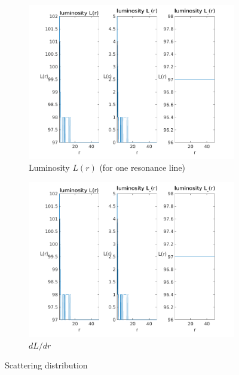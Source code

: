 \documentclass[../main/main.tex]{subfiles}
\begin{document}
\begin{figure}[!htbp]
\hspace*{-0.5in}
\centering
\begin{subfigure}{.6\textwidth}
\includegraphics[width=1\textwidth]{../../two_resonance_lines/figures/luminosity_one_resonance_line.png}
\caption{Luminosity $L(r)$ (for one resonance line)}
\label{luminosity_one_resonance_line}
\end{subfigure}%
\begin{subfigure}{.6\textwidth}
\includegraphics[width=1\textwidth]{../../two_resonance_lines/figures/luminosity_one_resonance_line.png}
\caption{$dL/dr$}
\end{subfigure}
\caption{Scattering distribution}
\label{PCyg_mu_eq_1}
\end{figure}
\end{document}
